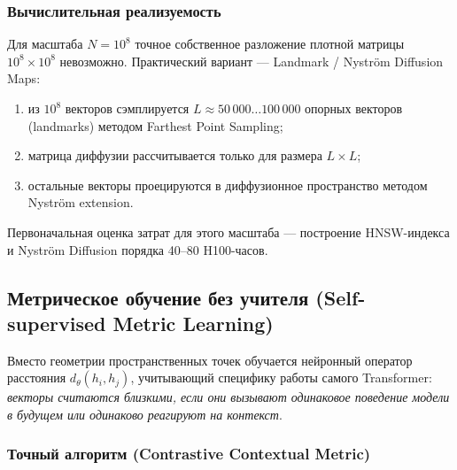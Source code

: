 \documentclass[11pt,a4paper]{article}
\begin{document}
\subsubsection*{Вычислительная реализуемость}

Для масштаба $N=10^8$ точное собственное разложение плотной матрицы $10^8\times10^8$ невозможно. Практический вариант — Landmark / Nyström Diffusion Maps:

\begin{enumerate}
    \item из $10^8$ векторов сэмплируется $L\approx50\,000\ldots100\,000$ опорных векторов (landmarks) методом Farthest Point Sampling;
    \item матрица диффузии рассчитывается только для размера $L\times L$;
    \item остальные векторы проецируются в диффузионное пространство методом Nyström extension.
\end{enumerate}

Первоначальная оценка затрат для этого масштаба — построение HNSW-индекса и Nyström Diffusion порядка 40--80 H100-часов.

\subsection*{Метрическое обучение без учителя (Self-supervised Metric Learning)}

Вместо геометрии пространственных точек обучается нейронный оператор расстояния $d_\theta(h_i,h_j)$, учитывающий специфику работы самого Transformer: \textit{векторы считаются близкими, если они вызывают одинаковое поведение модели в будущем или одинаково реагируют на контекст}.

\subsubsection*{Точный алгоритм (Contrastive Contextual Metric)}
\end{document}

